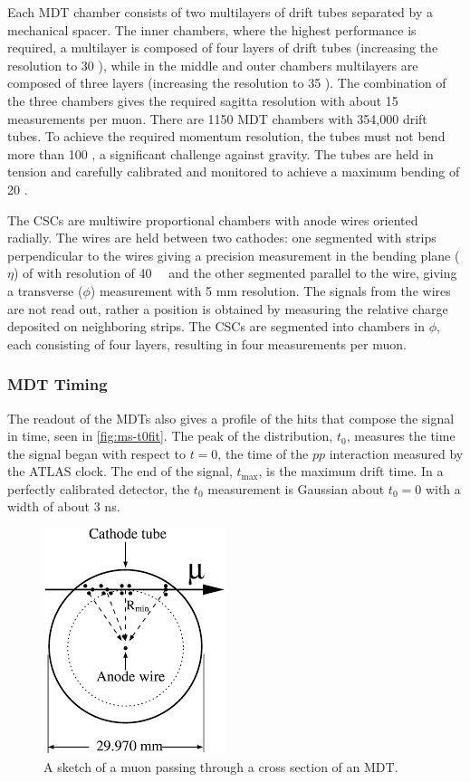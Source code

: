 Each \ac{MDT} chamber consists of two multilayers of drift tubes separated by a mechanical spacer. The inner chambers, where the highest performance is required, a multilayer is composed of four layers of drift tubes (increasing the resolution to 30 \um), while in the middle and outer chambers multilayers are composed of three layers (increasing the resolution to 35 \um). The combination of the three chambers gives the required sagitta resolution with about 15 measurements per muon. There are 1150 \ac{MDT} chambers with 354,000 drift tubes. To achieve the required momentum resolution, the tubes must not bend more than 100 \um, a significant challenge against gravity. The tubes are held in tension and carefully calibrated and monitored to achieve a maximum bending of 20 \um. 

The \ac{CSC}s are multiwire proportional chambers with anode wires oriented radially. The wires are held between two cathodes: one segmented with strips perpendicular to the wires giving a precision measurement in the bending plane ($\eta$) of with resolution of 40~\um~ and the other segmented parallel to the wire, giving a transverse ($\phi$) measurement with 5 mm resolution. The signals from the wires are not read out, rather a position is obtained by measuring the relative charge deposited on neighboring strips. The \ac{CSC}s are segmented into chambers in $\phi$, each consisting of four layers, resulting in four measurements per muon.


\subsubsection{MDT Timing}
\label{sec:mdt-timing}
The readout of the \ac{MDT}s also gives a profile of the hits that compose the signal in time, seen in \autoref{fig:ms-t0fit}. The peak of the distribution, $t_{0}$, measures the time the signal began with respect to $t=0$, the time of the $pp$ interaction measured by the \ac{ATLAS} clock. The end of the signal, $t_{\text{max}}$, is the maximum drift time. In a perfectly calibrated detector, the $t_{0}$ measurement is Gaussian about $t_{0} = 0$ with a width of about 3 ns. 



\begin{figure}[htbp]
\centering
\includegraphics[width=.4\textwidth]{figures/Detector/ms-drift.png}
\caption{A sketch of a muon passing through a cross section of an \ac{MDT}. \cite{atlas-overview}}
\label{fig:ms-drift}
\end{figure}

